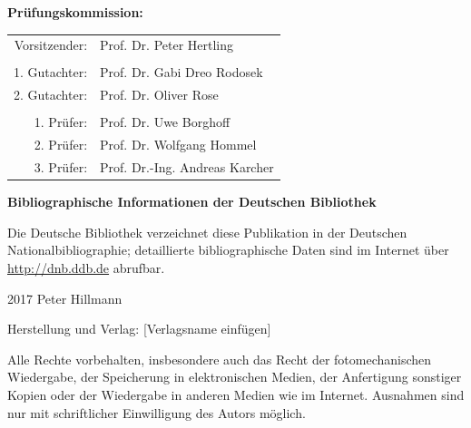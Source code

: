 
\thispagestyle{plain}

\vspace*{-1.0cm}
\begin{center}
  \textbf{Prüfungskommission:}
  
  \vspace{0.5cm}
  
  \begin{tabular}{rl}
    Vorsitzender: & Prof. Dr. Peter Hertling \\
    & \\
    1. Gutachter: & Prof. Dr. Gabi Dreo Rodosek\\
    2. Gutachter: & Prof. Dr. Oliver Rose\\
    & \\
    1. Prüfer: & Prof. Dr. Uwe Borghoff\\
    2. Prüfer: & Prof. Dr. Wolfgang Hommel\\
    3. Prüfer: & Prof. Dr.-Ing. Andreas Karcher\\
  \end{tabular}
\end{center}

\vfill

\textbf{Bibliographische Informationen der Deutschen Bibliothek}

Die Deutsche Bibliothek verzeichnet diese Publikation in der Deutschen Nationalbibliographie; detaillierte bibliographische Daten sind im Internet über \url{http://dnb.ddb.de} abrufbar.

\vspace{0.5cm}

\textcopyright{} 2017 Peter Hillmann

\vspace{0.5cm}

Herstellung und Verlag: [Verlagsname einfügen]

Alle Rechte vorbehalten, insbesondere auch das Recht der fotomechanischen Wiedergabe, der Speicherung in elektronischen Medien, der Anfertigung sonstiger Kopien oder der Wiedergabe in anderen Medien wie im Internet. Ausnahmen sind nur mit schriftlicher Einwilligung des Autors möglich.

\vspace{0.5cm}

